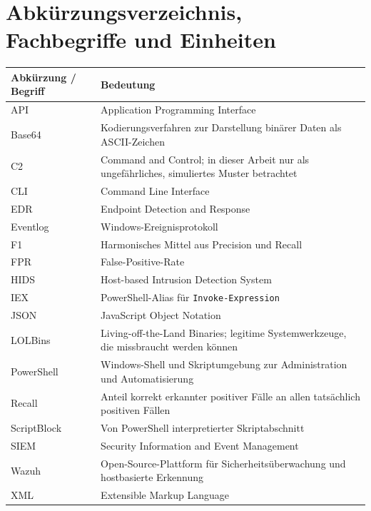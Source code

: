 \documentclass[12pt,a4paper,oneside,parskip=half]{scrreprt}
\begin{document}
\chapter*{Abkürzungsverzeichnis, Fachbegriffe und Einheiten}
\begin{longtable}{|L{4cm}|L{10cm}|}
\hline
\textbf{Abkürzung / Begriff} & \textbf{Bedeutung}\\
\hline
API & Application Programming Interface\\
\hline
Base64 & Kodierungsverfahren zur Darstellung binärer Daten als ASCII-Zeichen\\
\hline
C2 & Command and Control; in dieser Arbeit nur als ungefährliches, simuliertes Muster betrachtet\\
\hline
CLI & Command Line Interface\\
\hline
EDR & Endpoint Detection and Response\\
\hline
Eventlog & Windows-Ereignisprotokoll\\
\hline
F1 & Harmonisches Mittel aus Precision und Recall\\
\hline
FPR & False-Positive-Rate\\
\hline
HIDS & Host-based Intrusion Detection System\\
\hline
IEX & PowerShell-Alias für \texttt{Invoke-Expression}\\
\hline
JSON & JavaScript Object Notation\\
\hline
LOLBins & Living-off-the-Land Binaries; legitime Systemwerkzeuge, die missbraucht werden können\\
\hline
PowerShell & Windows-Shell und Skriptumgebung zur Administration und Automatisierung\\
\hline
Recall & Anteil korrekt erkannter positiver Fälle an allen tatsächlich positiven Fällen\\
\hline
ScriptBlock & Von PowerShell interpretierter Skriptabschnitt\\
\hline
SIEM & Security Information and Event Management\\
\hline
Wazuh & Open-Source-Plattform für Sicherheitsüberwachung und hostbasierte Erkennung\\
\hline
XML & Extensible Markup Language\\
\hline
\end{longtable}
\clearpage

\end{document}
